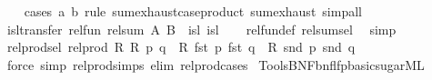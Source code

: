 \begin{isabellebody}
%
\isadelimproof
\ \ %
\endisadelimproof
%
\isatagproof
{}\isamarkupfalse%
\ {\isacharparenleft}{\kern0pt}cases\ a\ b\ rule{\isacharcolon}{\kern0pt}\ sum{\isachardot}{\kern0pt}exhaust{\isacharbrackleft}{\kern0pt}case{\isacharunderscore}{\kern0pt}product\ sum{\isachardot}{\kern0pt}exhaust{\isacharbrackright}{\kern0pt}{\isacharparenright}{\kern0pt}\ simp{\isacharunderscore}{\kern0pt}all%
\endisatagproof
{\isafoldproof}%
%
\isadelimproof
\isanewline
%
\endisadelimproof
\isanewline
{}\isamarkupfalse%
\ isl{\isacharunderscore}{\kern0pt}transfer{\isacharcolon}{\kern0pt}\ {\isachardoublequoteopen}rel{\isacharunderscore}{\kern0pt}fun\ {\isacharparenleft}{\kern0pt}rel{\isacharunderscore}{\kern0pt}sum\ A\ B{\isacharparenright}{\kern0pt}\ {\isacharparenleft}{\kern0pt}{\isacharequal}{\kern0pt}{\isacharparenright}{\kern0pt}\ isl\ isl{\isachardoublequoteclose}\isanewline
%
\isadelimproof
\ \ %
\endisadelimproof
%
\isatagproof
{}\isamarkupfalse%
\ rel{\isacharunderscore}{\kern0pt}fun{\isacharunderscore}{\kern0pt}def\ rel{\isacharunderscore}{\kern0pt}sum{\isacharunderscore}{\kern0pt}sel\ \isamarkupfalse%
\ simp%
\endisatagproof
{\isafoldproof}%
%
\isadelimproof
\isanewline
%
\endisadelimproof
\isanewline
{}\isamarkupfalse%
\ rel{\isacharunderscore}{\kern0pt}prod{\isacharunderscore}{\kern0pt}sel{\isacharcolon}{\kern0pt}\ {\isachardoublequoteopen}rel{\isacharunderscore}{\kern0pt}prod\ R{}\ R{}\ p\ q\ {\isacharequal}{\kern0pt}\ {\isacharparenleft}{\kern0pt}R{}\ {\isacharparenleft}{\kern0pt}fst\ p{\isacharparenright}{\kern0pt}\ {\isacharparenleft}{\kern0pt}fst\ q{\isacharparenright}{\kern0pt}\ {\isasymand}\ R{}\ {\isacharparenleft}{\kern0pt}snd\ p{\isacharparenright}{\kern0pt}\ {\isacharparenleft}{\kern0pt}snd\ q{\isacharparenright}{\kern0pt}{\isacharparenright}{\kern0pt}{\isachardoublequoteclose}\isanewline
%
\isadelimproof
\ \ %
\endisadelimproof
%
\isatagproof
{}\isamarkupfalse%
\ {\isacharparenleft}{\kern0pt}force\ simp{\isacharcolon}{\kern0pt}\ rel{\isacharunderscore}{\kern0pt}prod{\isachardot}{\kern0pt}simps\ elim{\isacharcolon}{\kern0pt}\ rel{\isacharunderscore}{\kern0pt}prod{\isachardot}{\kern0pt}cases{\isacharparenright}{\kern0pt}%
\endisatagproof
{\isafoldproof}%
%
\isadelimproof
\isanewline
%
\endisadelimproof
%
\isadelimML
\isanewline
%
\endisadelimML
%
\isatagML
{}\isamarkupfalse%
\ {\isacartoucheopen}Tools{\isacharslash}{\kern0pt}BNF{\isacharslash}{\kern0pt}bnf{\isacharunderscore}{\kern0pt}lfp{\isacharunderscore}{\kern0pt}basic{\isacharunderscore}{\kern0pt}sugar{\isachardot}{\kern0pt}ML{\isacartoucheclose}%

\end{isabellebody}
